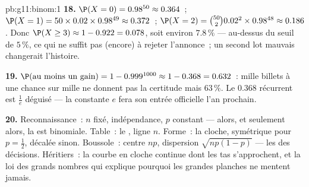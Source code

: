 \begin{solution}{pb:g11:binom:1}
\textbf{18.} $\P(X = 0) = 0.98^{50} \approx 0.364$~;
$\P(X = 1) = 50 \times 0.02 \times 0.98^{49} \approx 0.372$~;
$\P(X = 2) = \binom{50}{2} 0.02^2 \times 0.98^{48} \approx
0.186$. Donc $\P(X \geq 3) \approx 1 - 0.922 = 0.078$, soit environ
$7.8\,\%$ --- au-dessus du seuil de $5\,\%$, ce qui ne suffit pas
(encore) à rejeter l'annonce~; un second lot mauvais changerait
l'histoire.

\textbf{19.} $\P(\text{au moins un gain}) = 1 - 0.999^{1000}
\approx 1 - 0.368 = 0.632$~: mille billets à une chance sur mille
ne donnent pas la certitude mais $63\,\%$. Le $0.368$ récurrent est
$\frac1e$ déguisé --- la constante $e$ fera son entrée officielle
l'an prochain.

\textbf{20.} Reconnaissance~: $n$ fixé, indépendance, $p$ constant
--- alors, et seulement alors, la  est binomiale. Table~: le
, ligne $n$. Forme~: la cloche, symétrique pour
$p = \frac12$, décalée sinon. Boussole~: centre $np$, dispersion
$\sqrt{np(1-p)}$ --- les  des décisions. Héritiers~: la
courbe en cloche continue dont les tas s'approchent, et la loi des
grands nombres qui explique pourquoi les grandes planches ne mentent
jamais.
\end{solution}
